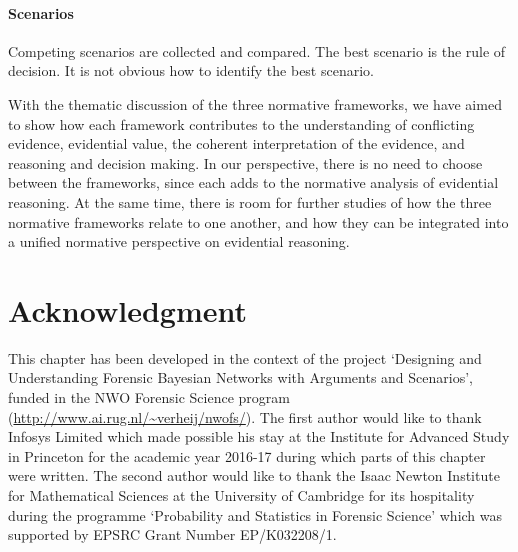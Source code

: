 \documentclass[10pt]{article}
\begin{document}
\paragraph{Scenarios}

Competing scenarios are collected and compared.
The best scenario is the rule of decision.
It is not obvious how to identify the best scenario.
	

\vspace{1em}
\noindent With the thematic discussion of the three normative frameworks, we have aimed to show how each framework contributes to the understanding of conflicting evidence, evidential value, the coherent interpretation of the evidence, and reasoning and decision making. %
In our perspective, there is no need to choose	 between the frameworks, since each adds to the normative analysis of evidential reasoning. At the same time, there is room for further studies of how the three normative frameworks relate to one another, and how they can be integrated into a unified normative perspective on evidential reasoning.

\section*{Acknowledgment}
This chapter has been developed in the context of the project `Designing and Understanding Forensic Bayesian Networks with Arguments and Scenarios', funded in the NWO Forensic Science program (\url{http://www.ai.rug.nl/~verheij/nwofs/}). The first author would like to thank Infosys 
Limited which made possible his stay at the Institute for Advanced Study in Princeton for the academic year 2016-17 during which parts of this chapter were written. The second author would like to thank the Isaac Newton Institute for Mathematical Sciences at the University of Cambridge for its hospitality during the programme `Probability and Statistics in Forensic Science' which was supported by EPSRC Grant Number EP/K032208/1. 


\newpage

\theendnotes

\newpage

%
	
%

\end{document}
